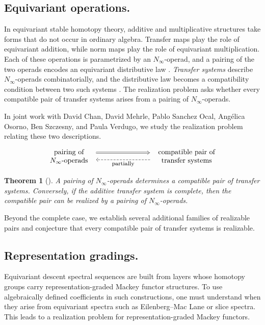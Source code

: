 \documentclass[11pt]{article}
\newtheorem{theorem}{Theorem}
\begin{document}
\subsection{Equivariant operations.}
In equivariant stable homotopy theory, additive and multiplicative structures take forms that do not occur in ordinary algebra.
Transfer maps play the role of equivariant addition, while norm maps play the role of equivariant multiplication. 
Each of these operations is parametrized by an \(N_\infty\)-operad, and a pairing of the two operads encodes an equivariant distributive law \cite{MR4327103}. 
\emph{Transfer systems} describe \(N_\infty\)-operads combinatorially, and the distributive law becomes a compatibility condition between two such systems \cite{MR4244201}.
The realization problem asks whether every compatible pair of transfer systems arises from a pairing of \(N_\infty\)-operads.

In joint work with David Chan, David Mehrle, Pablo Sanchez Ocal, Ang\'elica Osorno, Ben Szczesny, and Paula Verdugo, we study the realization problem relating these two descriptions.
\[
\begin{tikzcd}[column sep=8em]
\begin{array}{c}
\text{pairing of}\\
N_\infty\text{-operads}
\end{array}
\arrow[r, Rightarrow, shift left=1.3ex, shorten <=2pt, shorten >=2pt]
&
\begin{array}{c}
\text{compatible pair of}\\
\text{transfer systems}
\end{array}
\arrow[l, dashed, shift left=1ex,
       shorten <=2pt, shorten >=2pt,
       "\text{\footnotesize partially}"]
\end{tikzcd}
\]
\begin{theorem}[\cite{CCM+}]
A pairing of $N_\infty$-operads determines a compatible pair of
transfer systems.  Conversely, if the additive transfer system is
complete, then the compatible pair can be realized by a pairing of
$N_\infty$-operads.
\end{theorem}
Beyond the complete case, we establish several additional families of realizable pairs and conjecture that every compatible pair of transfer systems is realizable.

\subsection{Representation gradings.}
Equivariant descent spectral sequences are built from layers whose homotopy groups carry representation-graded Mackey functor structures. 
To use algebraically defined coefficients in such constructions, one must understand when they arise from equivariant spectra such as Eilenberg--Mac Lane or slice spectra.
This leads to a realization problem for representation-graded Mackey functors.
\end{document}
